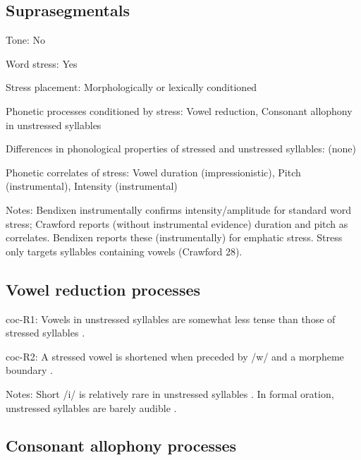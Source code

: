 {\subsection*{Suprasegmentals}
\begin{appendixdesc}
\item[Tone:] No

\item[Word stress:] Yes

\item[Stress placement:] Morphologically or lexically conditioned

\item[Phonetic processes conditioned by stress:] Vowel reduction, Consonant allophony in unstressed syllables

\item[Differences in phonological properties of stressed and unstressed syllables:] (none)

\item[Phonetic correlates of stress:] Vowel duration (impressionistic), Pitch (instrumental), Intensity (instrumental)

\item[Notes:] Bendixen instrumentally confirms intensity/amplitude for standard word stress; Crawford reports (without instrumental evidence) duration and pitch as correlates. Bendixen reports these (instrumentally) for emphatic stress. Stress only targets syllables containing vowels (Crawford 28).
\end{appendixdesc}
\subsection*{Vowel reduction processes}
\begin{appendixdesc}

\item[coc-R1:] Vowels in unstressed syllables are somewhat less tense than those of stressed syllables \citep[22]{Crawford1966}.

\item[coc-R2:] A stressed vowel is shortened when preceded by /w/ and a morpheme boundary \citep[67]{Bendixen1980}.

\item[Notes:] Short /i/ is relatively rare in unstressed syllables \citep[32]{Crawford1966}. In formal oration, unstressed syllables are barely audible \citep[332--333]{Bendixen1980}.
\end{appendixdesc}
\subsection*{Consonant allophony processes}
\begin{appendixdesc}


\end{appendixdesc}}
